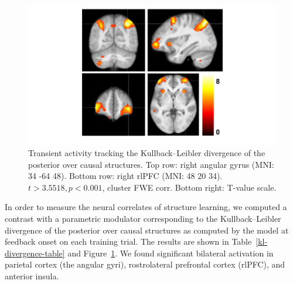 \documentclass[10pt,letterpaper]{article}
\begin{document}
\begin{figure}[ht]
\begin{center}
\includegraphics[scale=0.5,  trim = 130 50 0 0]{kl-divergence.pdf}
\end{center}
\caption{Transient activity tracking the Kullback--Leibler divergence of the posterior over causal structures. Top row: right angular gyrus (MNI: 34 -64 48). Bottom row: right rlPFC (MNI: 48 20 34). $t > 3.5518, p < 0.001$, cluster FWE corr. Bottom right: T-value scale.} 
\label{kl-divergence-img}
\end{figure}

In order to measure the neural correlates of structure learning, we computed a contrast with a parametric modulator corresponding to the Kullback--Leibler divergence of the posterior over causal structures as computed by the model at feedback onset on each training trial. The results are shown in Table~\ref{kl-divergence-table} and Figure~\ref{kl-divergence-img}. We found significant bilateral activation in parietal cortex (the angular gyri), rostrolateral prefrontal cortex (rlPFC), and anterior insula.
\end{document}
